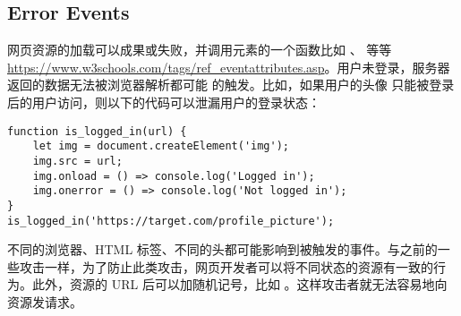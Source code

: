 \subsection{Error Events}

网页资源的加载可以成果或失败，并调用元素的一个函数比如 、 等等 \url{https://www.w3schools.com/tags/ref_eventattributes.asp}。用户未登录，服务器返回的数据无法被浏览器解析都可能  的触发。比如，如果用户的头像  只能被登录后的用户访问，则以下的代码可以泄漏用户的登录状态：

\begin{lstlisting}
function is_logged_in(url) {
    let img = document.createElement('img');
    img.src = url;
    img.onload = () => console.log('Logged in');
    img.onerror = () => console.log('Not logged in');
}
is_logged_in('https://target.com/profile_picture');

\end{lstlisting}

不同的浏览器、HTML 标签、不同的头都可能影响到被触发的事件。与之前的一些攻击一样，为了防止此类攻击，网页开发者可以将不同状态的资源有一致的行为。此外，资源的 URL 后可以加随机记号，比如 。这样攻击者就无法容易地向资源发请求。